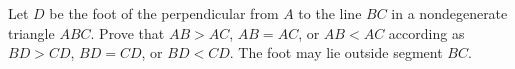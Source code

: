 Let $D$ be the foot of the perpendicular from $A$ to the line $BC$ in a nondegenerate triangle $ABC$. Prove that $AB>AC$, $AB=AC$, or $AB<AC$ according as $BD>CD$, $BD=CD$, or $BD<CD$. The foot may lie outside segment $BC$.
